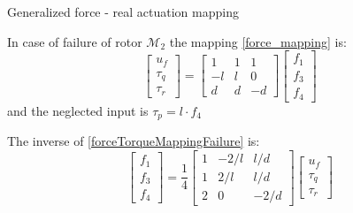 \begin{frame}{Generalized force - real actuation mapping}
	
	In case of failure of rotor $ \mathcal{M}_2 $ the mapping \eqref{force_mapping} is:
	\begin{equation}
	\begin{bmatrix}
	u_f \\ \tau_q \\ \tau_r
	\end{bmatrix} = 
	\begin{bmatrix}
	1 & 1 & 1 \\
	-l & l & 0 \\
	d  & d & -d
	\end{bmatrix}
	\begin{bmatrix}
	f_1 \\ f_3 \\ f_4
	\end{bmatrix}
	\label{forceTorqueMappingFailure}
	\end{equation}
	and the neglected input is $ \tau_p = l \cdot f_4 $
	\pause
	
	The inverse of \eqref{forceTorqueMappingFailure} is:
	\begin{equation}
	\begin{bmatrix}
	f_1 \\ f_3 \\ f_4
	\end{bmatrix} = \frac{1}{4} 
	\begin{bmatrix}
	1 & -2/l & l/d \\
	1 & 2/l & l/d \\
	2 & 0 & -2/d
	\end{bmatrix}
	\begin{bmatrix}
	u_f \\ \tau_q \\ \tau_r
	\end{bmatrix}
	\end{equation}
	
\end{frame}

